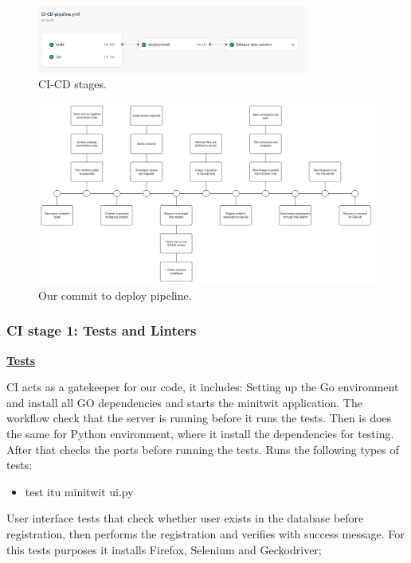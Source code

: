 \documentclass{article}
\begin{document}
\begin{figure}[ht]
    \centering
    \includegraphics[width=0.8\textwidth]{./images/CI-CD_stages.png}
    \caption{CI-CD stages.}
    \label{fig:CI-CD stages}
\end{figure}

\begin{figure}[ht]
    \centering
    \includegraphics[width=1.0\textwidth]{./images/CommitToDeploy.png} 
    \caption{Our commit to deploy pipeline.}
    \label{fig:Our commit to deploy pipeline.}
\end{figure}


\subsubsection{CI stage 1: Tests and Linters}
\noindent \textbf{\underline{Tests}} 

CI acts as a gatekeeper for our code, it includes: 
Setting up the Go environment and install all GO dependencies and starts the minitwit application. The workflow check that the server is running before it runs the tests.
Then is does the same for Python environment, where it install the dependencies for testing. After that checks the ports before running the tests.
Runs the following types of tests:
\begin{itemize}
    \item test itu minitwit ui.py
\end{itemize}
User interface tests that check whether user exists in the database before registration, then performs the registration and verifies with success message. For this tests purposes it installs Firefox, Selenium and Geckodriver;
\end{document}
